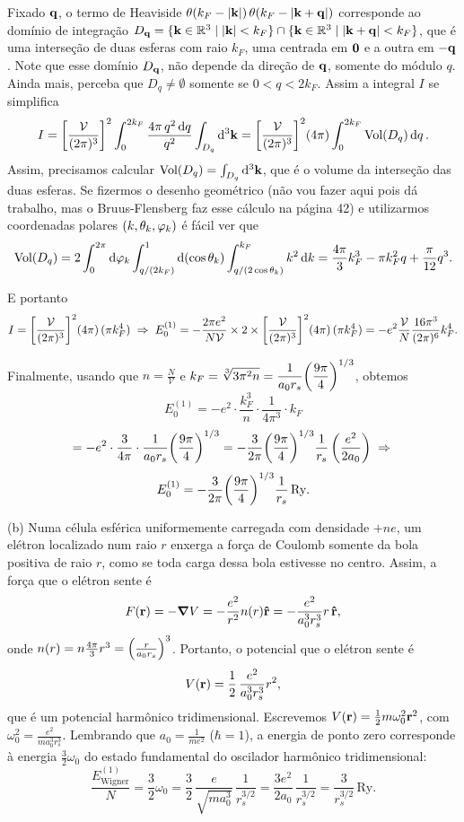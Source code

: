 \documentclass[a4paper,10pt]{article}
\begin{document}
Fixado $\vb{q}$, o termo de Heaviside $\theta(k_F - \abs{\vb{k}}) \, \theta(k_F - \abs{\vb{k} + \vb{q}})$ corresponde ao domínio de integração $D_{\vb{q}} = \{\vb{k} \in \mathbb{R}^3 \mid \abs{\vb{k}} < k_F\} \cap \{\vb{k} \in \mathbb{R}^3 \mid \abs{\vb{k} + \vb{q}} < k_F\}$, que é uma interseção de duas esferas com raio $k_F$, uma centrada em $\vb{0}$ e a outra em $-\vb{q}$. Note que esse domínio $D_{\vb{q}}$, não depende da direção de $\vb{q}$, somente do módulo $q$. Ainda mais, perceba que $D_q \neq \emptyset$ somente se $0 < q < 2 k_F$. Assim a integral $I$ se simplifica
$$
I = \qty[\frac{\mathcal{V}}{(2\pi)^3}]^2 \int_0^{2k_F} \frac{4\pi \, q^2 \dd{q}}{q^2} \int_{D_q} \dd[3]{\vb{k}} =
\qty[\frac{\mathcal{V}}{(2\pi)^3}]^2 (4\pi) \int_0^{2k_F} \text{Vol}(D_q) \dd{q}.
$$
Assim, precisamos calcular $\text{Vol}(D_q) = \int_{D_q} \dd[3]{\vb{k}}$, que é o volume da interseção das duas esferas. Se fizermos o desenho geométrico (não vou fazer aqui pois dá trabalho, mas o Bruus-Flensberg faz esse cálculo na página 42) e utilizarmos coordenadas polares $(k, \theta_k, \varphi_k)$ é fácil ver que
$$
\text{Vol}(D_q) = 2 \int_0^{2\pi} \dd{\varphi_k} \int_{q / (2 k_F)}^{1} \dd(\cos\theta_k) \int_{q / (2 \cos\theta_k)}^{k_F} k^2 \dd{k} = \frac{4\pi}{3} k_F^3 - \pi k_F^2 q + \frac{\pi}{12} q^3.
$$

E portanto
$$
I = \qty[\frac{\mathcal{V}}{(2\pi)^3}]^2 (4\pi) \, (\pi k_F^4) \; \Rightarrow \;
E_0^{(1)} = - \frac{2 \pi e^2}{N \mathcal{V}} \times 2 \times
\qty[\frac{\mathcal{V}}{(2\pi)^3}]^2 (4\pi) \, (\pi k_F^4)
= - e^2 \frac{\mathcal{V}}{N}
\frac{16 \pi^3 }{(2\pi)^6} k_F^4 .
$$

Finalmente, usando que $n = \frac{N}{\mathcal{V}}$ e $\displaystyle{ k_F = \sqrt[3]{3 \pi^2 n} = \frac{1}{a_0 r_s} \qty(\frac{9\pi}{4})^{1/3} }$, obtemos
\begin{equation} \label{eq:1ord}
E_0^{(1)} =
- e^2 \cdot \frac{k_F^3}{n} \cdot
\frac{1}{4 \pi^3} \cdot k_F
\end{equation}
$$
= - e^2 \cdot \frac{3}{4 \pi} \cdot \frac{1}{a_0 r_s} \qty(\frac{9\pi}{4})^{1/3}
= - \frac{3}{2\pi} \qty(\frac{9\pi}{4})^{1/3} \frac{1}{r_s} \, \qty(\frac{e^2}{2a_0}) \; \Rightarrow \;
$$
$$
E_0^{(1)}
= - \frac{3}{2\pi} \qty(\frac{9\pi}{4})^{1/3} \frac{1}{r_s} \, \text{Ry}.
$$

\n

(b) Numa célula esférica uniformemente carregada com densidade $+ne$, um elétron localizado num raio $r$ enxerga a força de Coulomb somente da bola positiva de raio $r$, como se toda carga dessa bola estivesse no centro. Assim, a força que o elétron sente é
$$
F(\vb{r}) = -\grad{V} = - \frac{e^2}{r^2} n(r) \vu{r} = -\frac{e^2}{a_0^3 r_s^3} r \, \vu{r},
$$
onde $n(r) = n \frac{4 \pi}{3} r^3 = \qty(\frac{r}{a_0 r_s})^3$. Portanto, o potencial que o elétron sente é
$$
V(\vb{r}) = \frac{1}{2} \, \frac{e^2}{a_0^3 r_s^3} r^2,
$$
que é um potencial harmônico tridimensional. Escrevemos $V(\vb{r}) = \frac{1}{2} m \omega_0^2 \vb{r}^2$, com $\omega_0^2 = \frac{e^2}{m a_0^3 r_s^3}$. Lembrando que $a_0 = \frac{1}{m e^2}$ ($\hbar = 1$), a energia de ponto zero corresponde à energia $\frac{3}{2} \omega_0$ do estado fundamental do oscilador harmônico tridimensional:
$$
\frac{E_{\text{Wigner}}^{(1)}}{N} = \frac{3}{2} \omega_0 =
\frac{3}{2} \, \frac{e}{\sqrt{m a_0^3}} \, \frac{1}{r_s^{3/2}} =
\frac{3 e^2}{2 a_0} \, \frac{1}{r_s^{3/2}} = \frac{3}{r_s^{3/2}} \, \text{Ry}.
$$
\end{document}

